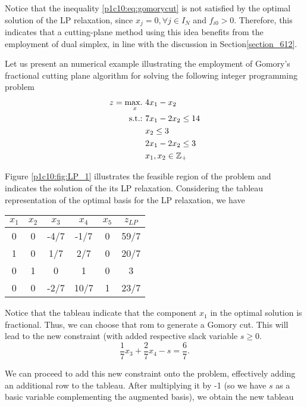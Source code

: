 Notice that the inequality \eqref{p1c10:eq:gomorycut} is not satisfied by the optimal solution of the LP relaxation, since $x_j = 0, \forall j \in I_N$ and $f_{i0} > 0$. Therefore, this indicates that a cutting-plane method using this idea benefits from the employment of dual simplex, in line with the discussion in Section\ref{section_612}. 

Let us present an numerical example illustrating the employment of Gomory's fractional cutting plane algorithm for solving the following integer programming problem
%
\begin{align*}
	z = \mathop{\text{max.~}}_x & 4x_1 - x_2\\
	\mathop{\text{s.t.:~}} & 7x_1 - 2x_2 \leq 14\\
	& x_2 \leq 3 \\
	&2x_1 -2x_2 \leq 3 \\
	&x_1, x_2 \in \mathbb{Z}_+ 
\end{align*}

Figure \ref{p1c10:fig:LP_1} illustrates the feasible region of the problem and indicates the solution of the its LP relaxation. Considering the tableau representation of the optimal basis for the LP relaxation, we have

\begin{center}
	\begin{tabular}{ccccc|c} 
		$x_1$ & $x_2$ & $x_3$ & $x_4$ & $x_5$ & $z_{LP}$ \\ \hline
		0 & 0 & -4/7 & -1/7 & 0 & 59/7 \\ \hline 
		1 & 0 & 1/7 & 2/7 & 0 & 20/7 \\
		0 & 1 &  0  &  1  & 0 & 3 \\
		0 & 0 & -2/7 & 10/7 & 1 & 23/7
	\end{tabular}	
\end{center}

Notice that the tableau indicate that the component $x_1$ in the optimal solution is fractional. Thus, we can choose that rom to generate a Gomory cut. This will lead to the new constraint (with added respective slack variable $s \ge 0$.
%
\begin{equation*}
	\frac{1}{7}x_3 + \frac{2}{7}x_4 - s = \frac{6}{7}.	
\end{equation*}

We can proceed to add this new constraint onto the problem, effectively adding an additional row to the tableau. After multiplying it by -1 (so we have $s$ as a basic variable complementing the augmented basis), we obtain the new tableau

